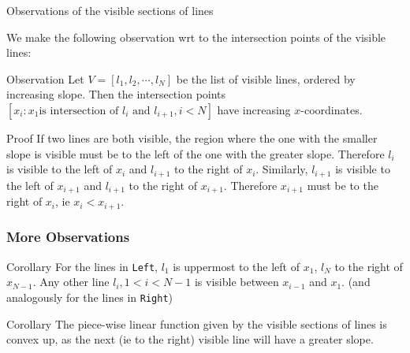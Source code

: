 \documentclass{article}
\begin{document}
\begin{frame}{Observations of the visible sections of lines}
  
  We make the following observation wrt to the intersection points of
  the visible lines:

  \begin{block}{Observation}
    Let $V = [l_1, l_2, \cdots, l_N]$ be the list of visible lines, ordered by increasing slope. 
    Then the intersection points $[x_i:  x_1 \text{is intersection of
      $l_i$ and $l_{i+1}, i < N$}]$ have increasing $x$-coordinates.
  \end{block}

  \begin{block}{Proof}
    If two lines are both visible, the region where the one with the
    smaller slope is visible must be to the left of the one with the greater
    slope. Therefore $l_i$ is visible to the left of $x_i$ and
    $l_{i+1}$ to the right of $x_i$. Similarly, $l_{i+1}$ is visible
    to the left of $x_{i+1}$ and $l_{i+1}$ to the right of
    $x_{i+1}$. Therefore $x_{i+1}$ must be to the right of $x_i$, ie
    $x_i < x_{i+1}$.
  \end{block}
\end{frame}
\begin{frame}
  \frametitle{More Observations}
  \begin{block}{Corollary}
    For the lines in \texttt{Left}, $l_1$ is uppermost to the left of $x_1$, $l_N$ to the right of
    $x_{N-1}$. Any other line $l_i, 1 < i < N-1$ is visible between
    $x_{i-1}$ and $x_1$. (and analogously for the lines in \texttt{Right})
  \end{block}

  \begin{block}{Corollary}
    The piece-wise linear function given by the visible sections of
    lines is convex up, as the next (ie to the right) visible line
    will have a greater slope. 
  \end{block}
\end{frame}
\end{document}
